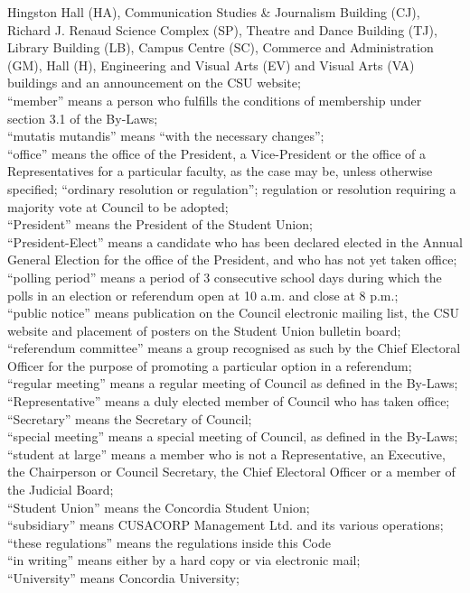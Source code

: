 \documentclass[oneside]{book}
\begin{document}
Hingston Hall (HA), Communication Studies \& Journalism Building (CJ),
Richard J. Renaud Science Complex (SP), Theatre and Dance Building
(TJ), Library Building (LB), Campus Centre (SC), Commerce and Administration
(GM), Hall (H), Engineering and Visual Arts (EV) and Visual Arts (VA)
buildings and an announcement on the CSU website; \\
``member'' means a person who fulfills the
conditions of membership under section 3.1 of the By-Laws; \\
``mutatis mutandis'' means ``with
the necessary changes''; \\
``office'' means the office of the President,
a Vice-President or the office of a Representatives for a particular
faculty, as the case may be, unless otherwise specified; ``ordinary
resolution or regulation''; regulation or resolution
requiring a majority vote at Council to be adopted; \\
``President'' means the President of the
Student Union; \\
``President-Elect'' means a candidate who
has been declared elected in the Annual General Election for the office
of the President, and who has not yet taken office; \\
``polling period'' means a period of 3 consecutive
school days during which the polls in an election or referendum open
at 10 a.m. and close at 8 p.m.; \\
``public notice'' means publication on the
Council electronic mailing list, the CSU website and placement of
posters on the Student Union bulletin board; \\
``referendum committee'' means a group recognised
as such by the Chief Electoral Officer for the purpose of promoting
a particular option in a referendum; \\
``regular meeting'' means a regular meeting
of Council as defined in the By-Laws; \\
``Representative'' means a duly elected
member of Council who has taken office; \\
``Secretary'' means the Secretary of Council;
\\
``special meeting'' means a special meeting
of Council, as defined in the By-Laws; \\
``student at large'' means a member who
is not a Representative, an Executive, the Chairperson or Council
Secretary, the Chief Electoral Officer or a member of the Judicial
Board; \\
``Student Union'' means the Concordia Student
Union; \\
``subsidiary'' means CUSACORP Management
Ltd. and its various operations; \\
``these regulations'' means the regulations
inside this Code \\
``in writing'' means either by a hard copy
or via electronic mail; \\
``University'' means Concordia University; 
\setcounter{secnumdepth}{3}
\end{document}
